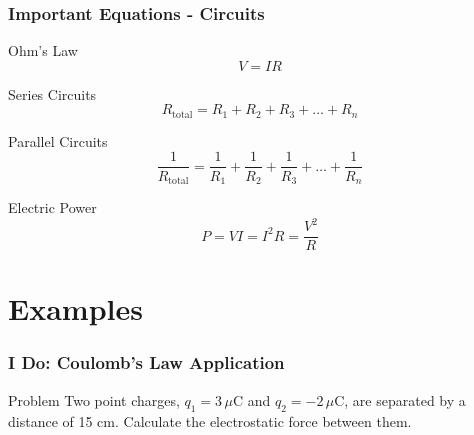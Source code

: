 \documentclass{beamer}
\begin{document}
\begin{frame}
    \frametitle{Important Equations - Circuits}
    \begin{block}{Ohm's Law}
        \begin{equation}
            V = IR
        \end{equation}
    \end{block}
    
    \begin{block}{Series Circuits}
        \begin{equation}
            R_{\text{total}} = R_1 + R_2 + R_3 + \ldots + R_n
        \end{equation}
    \end{block}
    
    \begin{block}{Parallel Circuits}
        \begin{equation}
            \frac{1}{R_{\text{total}}} = \frac{1}{R_1} + \frac{1}{R_2} + \frac{1}{R_3} + \ldots + \frac{1}{R_n}
        \end{equation}
    \end{block}
    
    \begin{block}{Electric Power}
        \begin{equation}
            P = VI = I^2R = \frac{V^2}{R}
        \end{equation}
    \end{block}
\end{frame}

\section{Examples}

\begin{frame}
    \frametitle{I Do: Coulomb's Law Application}
    \begin{block}{Problem}
        Two point charges, $q_1 = 3 \,\mu\text{C}$ and $q_2 = -2 \,\mu\text{C}$, are separated by a distance of 15 cm. Calculate the electrostatic force between them.
    \end{block}
    \end{frame}
\end{document}
